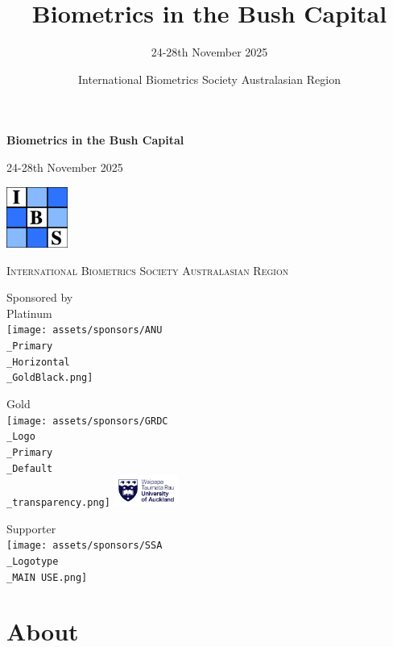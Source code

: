 \documentclass[
]{scrreprt}
\title{Biometrics in the Bush Capital}
\subtitle{24-28th November 2025}
\author{International Biometrics Society Australasian Region}
\date{}
\renewcommand*\contentsname{Table of contents}
\newcommand\contentsname{Table of contents}
\begin{document}
\begin{titlepage}

\centering
\vspace{4\baselineskip}
{\bfseries\fontsize{50}{50}\selectfont Biometrics in the Bush
Capital \par}
\vspace{3\baselineskip}
{\Large 24-28th November 2025 \par}
\includegraphics[height=20mm]{assets/sponsors/logo.jpg}\\
{\large\textsc{International Biometrics Society Australasian
Region} \par}
\vspace{2\baselineskip}
{\large Sponsored by}\\[5mm]
\centering
Platinum\\[3mm]
\texttt{[image: assets/sponsors/ANU\\\_Primary\\\_Horizontal\\\_GoldBlack.png]}
\par
Gold\\[3mm]
\texttt{[image: assets/sponsors/GRDC\\\_Logo\\\_Primary\\\_Default\\\_transparency.png]}
\includegraphics[height=10mm]{assets/sponsors/UoA-Logo-Primary-RGB-Large.png}
\par
Supporter\\[3mm]
\texttt{[image: assets/sponsors/SSA\\\_Logotype\\\_MAIN
USE.png]}
\par

\end{titlepage}

\newpage 

\renewcommand*\contentsname{Table of contents}
{
\hypersetup{linkcolor=}
\setcounter{tocdepth}{1}
\tableofcontents
}

\chapter{About}\label{about}
\end{document}
